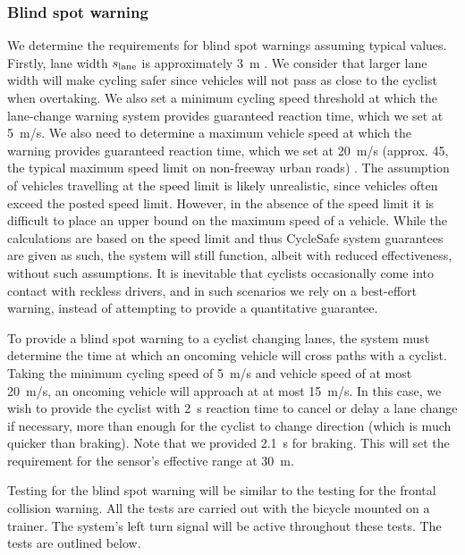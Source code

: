 \documentclass[journal]{IEEEtran}
\begin{document}
\subsubsection{Blind spot warning}
\label{specs:blindspot}
We determine the requirements for blind spot warnings assuming typical values. Firstly, lane width $s_\text{lane}$ is approximately \SI{3}{\meter} \cite{lane_width}. We consider that larger lane width will make cycling safer since vehicles will not pass as close to the cyclist when overtaking. We also set a minimum cycling speed threshold at which the lane-change warning system provides guaranteed reaction time, which we set at \SI{5}{\meter/\s}. We also need to determine a maximum vehicle speed at which the warning provides guaranteed reaction time, which we set at \SI{20}{\meter/\s} (approx. \SI{45}{\mph}, the typical maximum speed limit on non-freeway urban roads) \cite{speed_limit}.
The assumption of vehicles travelling at the speed limit is likely unrealistic, since vehicles often exceed the posted speed limit. However, in the absence of the speed limit it is difficult to place an upper bound on the maximum speed of a vehicle. While the calculations are based on the speed limit and thus CycleSafe system guarantees are given as such, the system will still function, albeit with reduced effectiveness, without such assumptions. It is inevitable that cyclists occasionally come into contact with reckless drivers, and in such scenarios we rely on a best-effort warning, instead of attempting to provide a quantitative guarantee.

To provide a blind spot warning to a cyclist changing lanes, the system must determine the time at which an oncoming vehicle will cross paths with a cyclist. Taking the minimum cycling speed of \SI{5}{\meter/\s} and vehicle speed of at most \SI{20}{\meter/\s}, an oncoming vehicle will approach at at most \SI{15}{\meter/\s}. In this case, we wish to provide the cyclist with \SI{2}{\s} reaction time to cancel or delay a lane change if necessary, more than enough for the cyclist to change direction (which is much quicker than braking). Note that we provided \SI{2.1}{s} for braking. This will set the requirement for the sensor's effective range at \SI{30}{\meter}.

Testing for the blind spot warning will be similar to the testing for the frontal collision warning. All the tests are carried out with the bicycle mounted on a trainer. The system's left turn signal will be active throughout these tests. The tests are outlined below.
\end{document}
